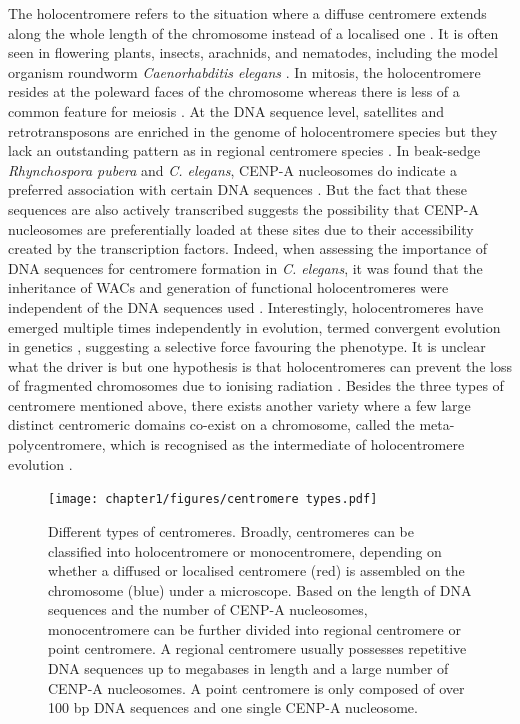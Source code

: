 The holocentromere refers to the situation where a diffuse centromere extends along the whole length of the chromosome instead of a localised one \citep{Guerra2010NeocentricsRules}. It is often seen in flowering plants, insects, arachnids, and nematodes, including the model organism roundworm \textit{Caenorhabditis elegans} \citep{Wong2020LessonsChromosomes}. In mitosis, the holocentromere resides at the poleward faces of the chromosome whereas there is less of a common feature for meiosis \citep{Maddox2004HoloerElegans, Buchwitz1999AElegans, Marques2016HolocentromereHolocentromeres}. At the DNA sequence level, satellites and retrotransposons are enriched in the genome of holocentromere species but they lack an outstanding pattern as in regional centromere species \citep{Kang2016DifferentialElimination, Heckmann2013TheOrganization, Marques2016RestructuringPubera}. In beak-sedge \textit{Rhynchospora pubera} and \textit{C. elegans}, CENP-A nucleosomes do indicate a preferred association with certain DNA sequences \citep{Marques2016HolocentromereHolocentromeres, Gassmann2012AnElegans, Steiner2014HolocentromeresHotspots}. But the fact that these sequences are also actively transcribed suggests the possibility that CENP-A nucleosomes are preferentially loaded at these sites due to their accessibility created by the transcription factors. Indeed, when assessing the importance of DNA sequences for centromere formation in \textit{C. elegans}, it was found that the inheritance of WACs and generation of functional holocentromeres were independent of the DNA sequences used \citep{Stinchcomb1985ExtrachromosomalElegans, Yuen2011RapidEmbryos}. Interestingly, holocentromeres have emerged multiple times independently in evolution, termed convergent evolution in genetics \citep{Guerra2019MonocentricFamily, Drinnenberg2014RecurrentInsects, Melters2012HolocentricAnalysis}, suggesting a selective force favouring the phenotype. It is unclear what the driver is but one hypothesis is that holocentromeres can prevent the loss of fragmented chromosomes due to ionising radiation \citep{Zedek2018HolocentricLand}. Besides the three types of centromere mentioned above, there exists another variety where a few large distinct centromeric domains co-exist on a chromosome, called the meta-polycentromere, which is recognised as the intermediate of holocentromere evolution \citep{Neumann2012StretchingDomains}. 

\begin{figure}[htbp]
  \centering
  \texttt{[image: chapter1/figures/centromere types.pdf]}
  \caption[Different types of centromeres]{Different types of centromeres. Broadly, centromeres can be classified into holocentromere or monocentromere, depending on whether a diffused or localised centromere (red) is assembled on the chromosome (blue) under a microscope. Based on the length of DNA sequences and the number of CENP-A nucleosomes, monocentromere can be further divided into regional centromere or point centromere. A regional centromere usually possesses repetitive DNA sequences up to megabases in length and a large number of CENP-A nucleosomes. A point centromere is only composed of over 100 bp DNA sequences and one single CENP-A nucleosome. }
  \label{fig:cenTypes}
\end{figure}

